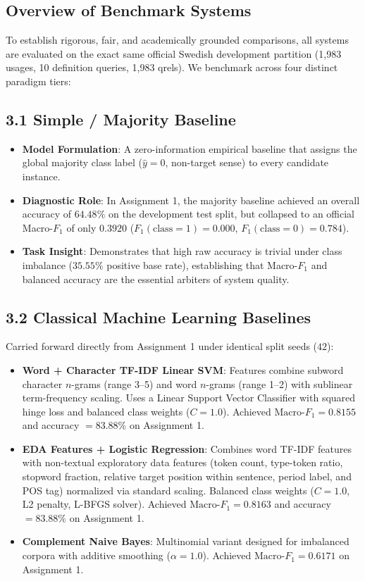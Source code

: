 \subsection{Overview of Benchmark Systems}
To establish rigorous, fair, and academically grounded comparisons, all systems are evaluated on the exact same official Swedish development partition (1,983 usages, 10 definition queries, 1,983 qrels). We benchmark across four distinct paradigm tiers:

\subsection{3.1 Simple / Majority Baseline}
\begin{itemize}
    \item \textbf{Model Formulation}: A zero-information empirical baseline that assigns the global majority class label ($\hat{y} = 0$, non-target sense) to every candidate instance.
    \item \textbf{Diagnostic Role}: In Assignment 1, the majority baseline achieved an overall accuracy of $64.48\%$ on the development test split, but collapsed to an official Macro-$F_1$ of only $0.3920$ ($F_1(\text{class}=1) = 0.000$, $F_1(\text{class}=0) = 0.784$).
    \item \textbf{Task Insight}: Demonstrates that high raw accuracy is trivial under class imbalance ($35.55\%$ positive base rate), establishing that Macro-$F_1$ and balanced accuracy are the essential arbiters of system quality.
\end{itemize}

\subsection{3.2 Classical Machine Learning Baselines}
Carried forward directly from Assignment 1 under identical split seeds ($42$):
\begin{itemize}
    \item \textbf{Word + Character TF-IDF Linear SVM}: Features combine subword character $n$-grams (range 3--5) and word $n$-grams (range 1--2) with sublinear term-frequency scaling. Uses a Linear Support Vector Classifier with squared hinge loss and balanced class weights ($C=1.0$). Achieved $\text{Macro-}F_1 = 0.8155$ and accuracy $= 83.88\%$ on Assignment 1.
    \item \textbf{EDA Features + Logistic Regression}: Combines word TF-IDF features with non-textual exploratory data features (token count, type-token ratio, stopword fraction, relative target position within sentence, period label, and POS tag) normalized via standard scaling. Balanced class weights ($C=1.0$, L2 penalty, L-BFGS solver). Achieved $\text{Macro-}F_1 = 0.8163$ and accuracy $= 83.88\%$ on Assignment 1.
    \item \textbf{Complement Naive Bayes}: Multinomial variant designed for imbalanced corpora with additive smoothing ($\alpha=1.0$). Achieved $\text{Macro-}F_1 = 0.6171$ on Assignment 1.
\end{itemize}

